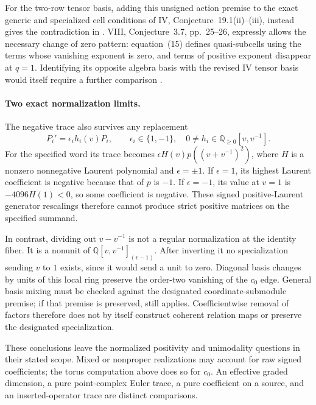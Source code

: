 For the two-row tensor basis, adding this unsigned
action premise to the exact generic and specialized
cell conditions of IV, Conjecture~19.1(ii)--(iii),
instead gives the contradiction in .
VIII, Conjecture~3.7, pp.~25--26, expressly allows
the necessary change of zero pattern: equation~(15)
defines quasi-subcells using the terms whose vanishing
exponent is zero, and terms of positive exponent
disappear at \(q=1\).
Identifying its opposite algebra basis with the
revised IV tensor basis would itself require a
further comparison \cite{VIII,IV}.

\paragraph{Two exact normalization limits.}
The negative trace also survives any replacement
\[
 P_i'=\epsilon_i h_i(v)P_i,\qquad
 \epsilon_i\in\{1,-1\},\quad
 0\ne h_i\in\mathbb Q_{\ge0}[v,v^{-1}].
\]
For the specified  word its trace becomes
\(\epsilon H(v)p((v+v^{-1})^2)\), where \(H\) is a
nonzero nonnegative Laurent polynomial and
\(\epsilon=\pm1\).
If \(\epsilon=1\), its highest Laurent coefficient
is negative because that of \(p\) is \(-1\).
If \(\epsilon=-1\), its value at \(v=1\) is
\(-4096H(1)<0\), so some coefficient is negative.
These signed positive-Laurent generator rescalings
therefore cannot produce strict positive matrices
on the specified summand.

In contrast, dividing out \(v-v^{-1}\) is not a
regular normalization at the identity fiber.
It is a nonunit of
\(\mathbb Q[v,v^{-1}]_{(v-1)}\).
After inverting it no specialization sending
\(v\) to \(1\) exists, since it would send a unit
to zero. Diagonal basis changes by units of this
local ring preserve the order-two vanishing of
the \(c_0\) edge. General basis mixing must be checked
against the designated coordinate-submodule premise;
if that premise
is preserved,  still applies.
Coefficientwise removal of factors therefore does
not by itself construct coherent relation maps or
preserve the designated specialization.

These conclusions leave the normalized positivity
and unimodality questions in their stated scope.
Mixed or nonproper realizations may account for raw
signed coefficients; the torus computation above
does so for \(c_0\).
An effective graded dimension, a pure point-complex
Euler trace, a pure coefficient on a source, and an
inserted-operator trace are distinct comparisons.

